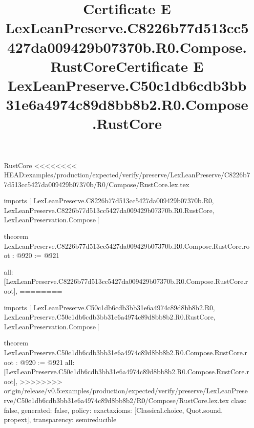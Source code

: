 \begin{lexlean}{RustCore}
<<<<<<<< HEAD:examples/production/expected/verify/preserve/LexLeanPreserve/C8226b77d513cc5427da009429b07370b/R0/Compose/RustCore.lex.tex
\title{Certificate E LexLeanPreserve.C8226b77d513cc5427da009429b07370b.R0.Compose.RustCore}
\begin{coremodule}
imports [
  LexLeanPreserve.C8226b77d513cc5427da009429b07370b.R0,
  LexLeanPreserve.C8226b77d513cc5427da009429b07370b.R0.RustCore,
  LexLeanPreservation.Compose
]

theorem LexLeanPreserve.C8226b77d513cc5427da009429b07370b.R0.Compose.RustCore.root : @920 := @921 {
  all: [LexLeanPreserve.C8226b77d513cc5427da009429b07370b.R0.Compose.RustCore.root],
========
\title{Certificate E LexLeanPreserve.C50c1db6cdb3bb31e6a4974c89d8bb8b2.R0.Compose.RustCore}
\begin{coremodule}
imports [
  LexLeanPreserve.C50c1db6cdb3bb31e6a4974c89d8bb8b2.R0,
  LexLeanPreserve.C50c1db6cdb3bb31e6a4974c89d8bb8b2.R0.RustCore,
  LexLeanPreservation.Compose
]

theorem LexLeanPreserve.C50c1db6cdb3bb31e6a4974c89d8bb8b2.R0.Compose.RustCore.root : @920 := @921 {
  all: [LexLeanPreserve.C50c1db6cdb3bb31e6a4974c89d8bb8b2.R0.Compose.RustCore.root],
>>>>>>>> origin/release/v0.5:examples/production/expected/verify/preserve/LexLeanPreserve/C50c1db6cdb3bb31e6a4974c89d8bb8b2/R0/Compose/RustCore.lex.tex
  class: false,
  generated: false,
  policy: exact{axioms: [Classical.choice, Quot.sound, propext]},
  transparency: semireducible
}


\end{coremodule}}
\end{coremodule}
\end{lexlean}
